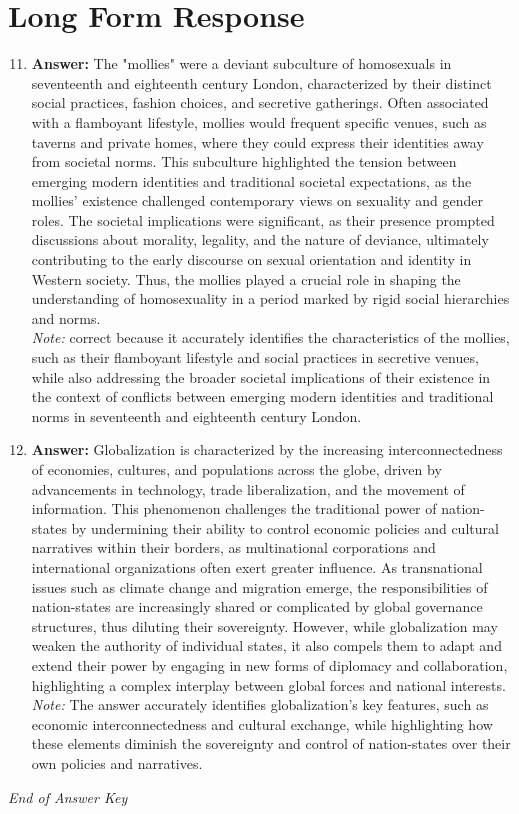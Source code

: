 \documentclass[12pt]{article}
\begin{document}
\section*{Long Form Response}
\begin{enumerate}[label=\arabic*.]
\setcounter{enumi}{10}
\item \textbf{Answer:} The "mollies" were a deviant subculture of homosexuals in seventeenth and eighteenth century London, characterized by their distinct social practices, fashion choices, and secretive gatherings. Often associated with a flamboyant lifestyle, mollies would frequent specific venues, such as taverns and private homes, where they could express their identities away from societal norms. This subculture highlighted the tension between emerging modern identities and traditional societal expectations, as the mollies' existence challenged contemporary views on sexuality and gender roles. The societal implications were significant, as their presence prompted discussions about morality, legality, and the nature of deviance, ultimately contributing to the early discourse on sexual orientation and identity in Western society. Thus, the mollies played a crucial role in shaping the understanding of homosexuality in a period marked by rigid social hierarchies and norms.
\\ \textit{Note:} correct because it accurately identifies the characteristics of the mollies, such as their flamboyant lifestyle and social practices in secretive venues, while also addressing the broader societal implications of their existence in the context of conflicts between emerging modern identities and traditional norms in seventeenth and eighteenth century London.
\item \textbf{Answer:} Globalization is characterized by the increasing interconnectedness of economies, cultures, and populations across the globe, driven by advancements in technology, trade liberalization, and the movement of information. This phenomenon challenges the traditional power of nation-states by undermining their ability to control economic policies and cultural narratives within their borders, as multinational corporations and international organizations often exert greater influence. As transnational issues such as climate change and migration emerge, the responsibilities of nation-states are increasingly shared or complicated by global governance structures, thus diluting their sovereignty. However, while globalization may weaken the authority of individual states, it also compels them to adapt and extend their power by engaging in new forms of diplomacy and collaboration, highlighting a complex interplay between global forces and national interests.
\\ \textit{Note:} The answer accurately identifies globalization's key features, such as economic interconnectedness and cultural exchange, while highlighting how these elements diminish the sovereignty and control of nation-states over their own policies and narratives.
\end{enumerate}

\vfill
\noindent\textit{End of Answer Key}
\end{document}
